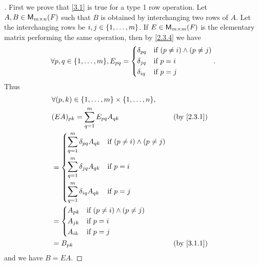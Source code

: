 \begin{proof}[]
  First we prove that \cref{3.1} is true for a type 1 row operation.
  Let \(A, B \in \mathsf{M}_{{m} \times n}({\mathit{F}})\) such that \(B\) is obtained by interchanging two rows of \(A\).
  Let the interchanging rows be \(i, j \in \left\lbrace1, \dots, m\right\rbrace\).
  If \(E \in \mathsf{M}_{{m} \times m}({\mathit{F}})\) is the elementary matrix performing the same operation, then by \cref{2.3.4} we have
  \[
    \forall p, q \in \set{1, \dots, m}, E_{p q} = \begin{dcases}
      \delta_{p q} & \text{if } (p \neq i) \land (p \neq j) \\
      \delta_{j q} & \text{if } p = i                       \\
      \delta_{i q} & \text{if } p = j
    \end{dcases}.
  \]
  Thus
  \begin{align*}
     & \forall (p, k) \in \set{1, \dots, m} \times \set{1, \dots, n},                                                \\
     & (EA)_{p k} = \sum_{q = 1}^m E_{p q} A_{q k}                                     &  & \text{(by \cref{2.3.1})} \\
     & = \begin{dcases}
           \sum_{q = 1}^m \delta_{p q} A_{q k} & \text{if } (p \neq i) \land (p \neq j) \\
           \sum_{q = 1}^m \delta_{j q} A_{q k} & \text{if } p = i                       \\
           \sum_{q = 1}^m \delta_{i q} A_{q k} & \text{if } p = j
         \end{dcases}                                \\
     & = \begin{dcases}
           A_{p k} & \text{if } (p \neq i) \land (p \neq j) \\
           A_{j k} & \text{if } p = i                       \\
           A_{i k} & \text{if } p = j
         \end{dcases}                                                            \\
     & = B_{p k}                                                                       &  & \text{(by \cref{3.1.1})}
  \end{align*}
  and we have \(B = EA\).


\end{proof}
